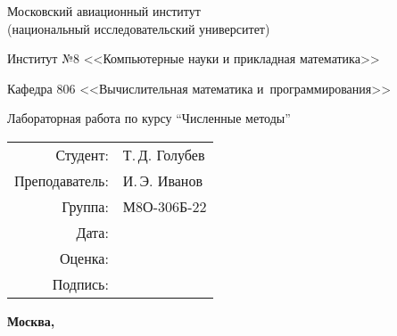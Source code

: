 \begin{titlepage}
    \begin{center}
    \bfseries
    
    {\Large Московский авиационный институт\\ (национальный исследовательский университет)
    
    }
    
    \vspace{48pt}
    
    {\large Институт №8 <<Компьютерные науки и прикладная математика>>
    }
    
    \vspace{36pt}
    
    {\large Кафедра 806 <<Вычислительная математика и~программирования>>
    
    }
    
    
    \vspace{48pt}
    
    Лабораторная работа  по курсу \enquote{Численные методы}
    
    \end{center}
    
    \vspace{72pt}
    
    \begin{flushright}
    \begin{tabular}{rl}
    Студент: & Т.\,Д. Голубев \\
    Преподаватель: & И.\,Э. Иванов \\
    Группа: & М8О-306Б-22 \\
    Дата: & \\
    Оценка: & \\
    Подпись: & \\
    \end{tabular}
    \end{flushright}
    
    \vfill
    
    \begin{center}
    \bfseries
    Москва, \the\year
    \end{center}
    \end{titlepage}
    
    \pagebreak
    